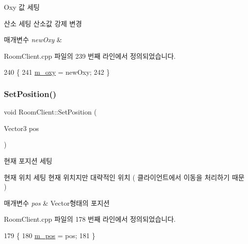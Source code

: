 Oxy 값 세팅 

산소 세팅  산소값 강제 변경


\begin{DoxyParams}{매개변수}
{\em new\+Oxy} & \\
\hline
\end{DoxyParams}


Room\+Client.\+cpp 파일의 239 번째 라인에서 정의되었습니다.


\begin{DoxyCode}
240 \{
241     \hyperlink{class_room_client_a8c0bd64aa8b2d03f23b9a1ab5c2c2c1a}{m\_oxy} = newOxy;
242 \}
\end{DoxyCode}
\mbox{\label{class_room_client_a0f21c1dbda294ebe79195248c5d32dc6}} 
\subsubsection{\texorpdfstring{Set\+Position()}{SetPosition()}\hspace{0.1cm}{\footnotesize\ttfamily [1/2]}}
{\footnotesize\ttfamily void Room\+Client\+::\+Set\+Position (\begin{DoxyParamCaption}\item[{Vector3}]{pos }\end{DoxyParamCaption})}



현재 포지션 세팅 

현재 위치 세팅  현재 위치지만 대략적인 위치 ( 클라이언트에서 이동을 처리하기 때문 )


\begin{DoxyParams}{매개변수}
{\em pos} & Vector형태의 포지션 \\
\hline
\end{DoxyParams}


Room\+Client.\+cpp 파일의 178 번째 라인에서 정의되었습니다.


\begin{DoxyCode}
179 \{
180     \hyperlink{class_room_client_a7000a6db44ab9d2f646d625d33c8d8b7}{m\_pos} = pos;
181 \}
\end{DoxyCode}
\mbox{\label{class_room_client_a4b76c74d4c9fdaaac4f876f6d35a8bfb}} 
